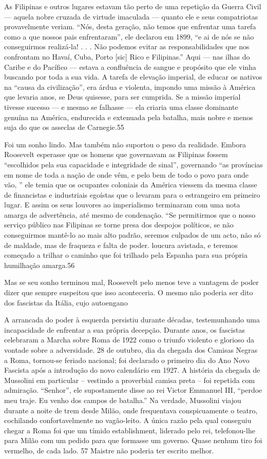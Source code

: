 As Filipinas e outros lugares estavam tão perto de uma repetição da Guerra Civil — aquela nobre cruzada de virtude imaculada — quanto ele e seus compatriotas provavelmente veriam. “Nós, desta geração, não temos que enfrentar uma tarefa como a que nossos pais enfrentaram”, ele declarou em 1899, “e ai de nós se não conseguirmos realizá-la! . . . Não podemos evitar as responsabilidades que nos confrontam no Havaí, Cuba, Porto [sic] Rico e Filipinas.” Aqui — nas ilhas do Caribe e do Pacífico — estava a confluência de sangue e propósito que ele vinha buscando por toda a sua vida. A tarefa de elevação imperial, de educar os nativos na “causa da civilização”, era árdua e violenta, impondo uma missão à América que levaria anos, se Deus quisesse, para ser cumprida. Se a missão imperial tivesse sucesso — e mesmo se falhasse — ela criaria uma classe dominante genuína na América, endurecida e extenuada pela batalha, mais nobre e menos suja do que os asseclas de Carnegie.{\color{blue}55}
 \par 
Foi um sonho lindo. Mas também não suportou o peso da realidade. Embora Roosevelt esperasse que os homens que governavam as Filipinas fossem “escolhidos pela sua capacidade e integridade de sinal”, governando “as províncias em nome de toda a nação de onde vêm, e pelo bem de todo o povo para onde vão, ” ele temia que os ocupantes coloniais da América viessem da mesma classe de financistas e industriais egoístas que o levaram para o estrangeiro em primeiro lugar. E assim os seus louvores ao imperialismo terminaram com uma nota amarga de advertência, até mesmo de condenação. “Se permitirmos que o nosso serviço público nas Filipinas se torne presa dos despojos políticos, se não conseguirmos mantê-lo ao mais alto padrão, seremos culpados de um acto, não só de maldade, mas de fraqueza e falta de poder. loucura avistada, e teremos começado a trilhar o caminho que foi trilhado pela Espanha para sua própria humilhação amarga.{\color{blue}56}
 \par 
Mas se seu sonho terminou mal, Roosevelt pelo menos teve a vantagem de poder dizer que sempre suspeitou que isso aconteceria. O mesmo não poderia ser dito dos fascistas da Itália, cujo autoengano
 \par 
A arrancada do poder à esquerda persistiu durante décadas, testemunhando uma incapacidade de enfrentar a sua própria decepção. Durante anos, os fascistas celebraram a Marcha sobre Roma de 1922 como o triunfo violento e glorioso da vontade sobre a adversidade. {\color{blue}28} de outubro, dia da chegada dos Camisas Negras a Roma, tornou-se feriado nacional; foi declarado o primeiro dia do Ano Novo Fascista após a introdução do novo calendário em 1927. A história da chegada de Mussolini em particular – vestindo a proverbial camisa preta – foi repetida com admiração. “Senhor”, ele supostamente disse ao rei Victor Emmanuel III, “perdoe meu traje. Eu venho dos campos de batalha.” Na verdade, Mussolini viajou durante a noite de trem desde Milão, onde frequentava conspicuamente o teatro, cochilando confortavelmente no vagão-leito. A única razão pela qual conseguiu chegar a Roma foi que um tímido establishment, liderado pelo rei, telefonou-lhe para Milão com um pedido para que formasse um governo. Quase nenhum tiro foi vermelho, de cada lado. {\color{blue}57} Maistre não poderia ter escrito melhor.
